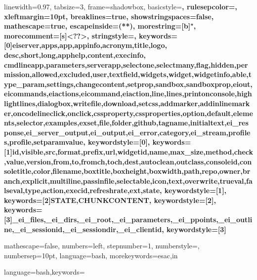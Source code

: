 {%
}


{
  linewidth=0.97\textwidth,
  tabsize=3,
  frame=shadowbox,
  basicstyle=\small\ttfamily\color{black}\bfseries,
  rulesepcolor=\color{gray},
  xleftmargin=10pt,
  breaklines=true,
  showstringspaces=false,
  mathescape=true,
  escapeinside={(*}{*)}, 
  morestring=[b]",
  morecomment=[s]{<?}{?>},
  stringstyle=\color{green},
  keywords=[0]{eiserver,apps,app,appinfo,acronym,title,logo,
               desc,short,long,apphelp,content,execinfo,
               cmdlineapp,parameters,serverapp,selectone,selectmany,flag,hidden,permission,allowed,excluded,user,textfield,widgets,widget,widgetinfo,able,type_param,settings,changecontent,setprop,sandbox,sandboxprop,eiout,eicommands,eiactions,eicommand,eiaction,line,lines,printonconsole,highlightlines,dialogbox,writefile,download,setcss,addmarker,addinlinemarker,oncodelineclick,onclick,cssproperty,cssproperties,option,default,elements,selector,examples,exset,file,folder,github,tagname,initialtext,ei\_response,ei\_server\_output,ei\_output,ei\_error,category,ei\_stream,profiles,profile,setparamvalue},
  keywordstyle=[0]\color{blue}\bf,
  keywords=[1]{id,visible,src,format,prefix,url,widgetid,name,max_size,method,check,value,version,from,to,fromch,toch,dest,autoclean,outclass,consoleid,consoletitle,color,filename,boxtitle,boxheight,boxwidth,path,repo,owner,branch,explicit,multiline,passinfile,selectable,icon,text,overwrite,trueval,falseval,type,action,execid,refreshrate,ext,state},
  keywordstyle=[1]\color{orange},
  keywords=[2]{STATE,CHUNKCONTENT},
  keywordstyle=[2]\color{red}\bfseries,
  keywords=[3]{_ei_files,_ei_dirs,_ei_root,_ei_parameters,_ei_ppoints,_ei_outline,_ei_sessionid,_ei_sessiondir,_ei_clientid},
  keywordstyle=[3]
}
\lstset{language=XML}


{mathescape=false, numbers=left, stepnumber=1, numberstyle=\tiny, numbersep=10pt, language=bash, morekeywords={esac,in}}

{language=bash,keywords={}}

\let\lst\lstinline


